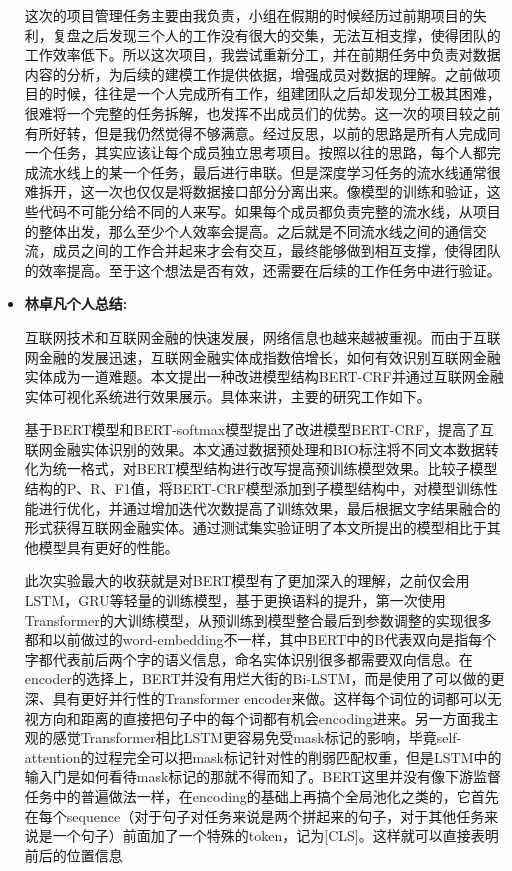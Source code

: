 \documentclass[letterpaper]{article}
\begin{document}
\begin{itemize}
  这次的项目管理任务主要由我负责，小组在假期的时候经历过前期项目的失利，复盘之后发现三个人的工作没有很大的交集，无法互相支撑，使得团队的工作效率低下。所以这次项目，我尝试重新分工，并在前期任务中负责对数据内容的分析，为后续的建模工作提供依据，增强成员对数据的理解。之前做项目的时候，往往是一个人完成所有工作，组建团队之后却发现分工极其困难，很难将一个完整的任务拆解，也发挥不出成员们的优势。这一次的项目较之前有所好转，但是我仍然觉得不够满意。经过反思，以前的思路是所有人完成同一个任务，其实应该让每个成员独立思考项目。按照以往的思路，每个人都完成流水线上的某一个任务，最后进行串联。但是深度学习任务的流水线通常很难拆开，这一次也仅仅是将数据接口部分分离出来。像模型的训练和验证，这些代码不可能分给不同的人来写。如果每个成员都负责完整的流水线，从项目的整体出发，那么至少个人效率会提高。之后就是不同流水线之间的通信交流，成员之间的工作合并起来才会有交互，最终能够做到相互支撑，使得团队的效率提高。至于这个想法是否有效，还需要在后续的工作任务中进行验证。
  
  \newpage
  \item \textbf{林卓凡个人总结:}
  
  互联网技术和互联网金融的快速发展，网络信息也越来越被重视。而由于互联网金融的发展迅速，互联网金融实体成指数倍增长，如何有效识别互联网金融实体成为一道难题。本文提出一种改进模型结构BERT-CRF并通过互联网金融实体可视化系统进行效果展示。具体来讲，主要的研究工作如下。 
  
  基于BERT模型和BERT-softmax模型提出了改进模型BERT-CRF，提高了互联网金融实体识别的效果。本文通过数据预处理和BIO标注将不同文本数据转化为统一格式，对BERT模型结构进行改写提高预训练模型效果。比较子模型结构的P、R、F1值，将BERT-CRF模型添加到子模型结构中，对模型训练性能进行优化，并通过增加迭代次数提高了训练效果，最后根据文字结果融合的形式获得互联网金融实体。通过测试集实验证明了本文所提出的模型相比于其他模型具有更好的性能。 
  
  此次实验最大的收获就是对BERT模型有了更加深入的理解，之前仅会用LSTM，GRU等轻量的训练模型，基于更换语料的提升，第一次使用Transformer的大训练模型，从预训练到模型整合最后到参数调整的实现很多都和以前做过的word-embedding不一样，其中BERT中的B代表双向是指每个字都代表前后两个字的语义信息，命名实体识别很多都需要双向信息。在encoder的选择上，BERT并没有用烂大街的Bi-LSTM，而是使用了可以做的更深、具有更好并行性的Transformer encoder来做。这样每个词位的词都可以无视方向和距离的直接把句子中的每个词都有机会encoding进来。另一方面我主观的感觉Transformer相比LSTM更容易免受mask标记的影响，毕竟self-attention的过程完全可以把mask标记针对性的削弱匹配权重，但是LSTM中的输入门是如何看待mask标记的那就不得而知了。BERT这里并没有像下游监督任务中的普遍做法一样，在encoding的基础上再搞个全局池化之类的，它首先在每个sequence（对于句子对任务来说是两个拼起来的句子，对于其他任务来说是一个句子）前面加了一个特殊的token，记为[CLS]。这样就可以直接表明前后的位置信息
  

\end{itemize}
\end{document}

